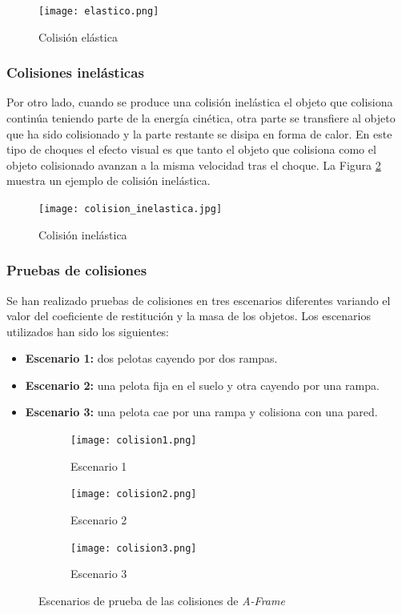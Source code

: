 \begin{figure}[h!]
    \centering
    \texttt{[image: elastico.png]}
    \caption[Colisión elástica]{Colisión elástica\footnotemark}
    \label{fig:elastico}
\end{figure}


\subsubsection{Colisiones inelásticas}
Por otro lado, cuando se produce una colisión inelástica el objeto que colisiona continúa teniendo parte de la energía cinética, otra parte se transfiere al objeto que ha sido colisionado y la parte restante se disipa en forma de calor. En este tipo de choques el efecto visual es que tanto el objeto que colisiona como el objeto colisionado avanzan a la misma velocidad tras el choque. La Figura \ref{fig:inelastico} muestra un ejemplo de colisión inelástica.

\begin{figure}[h!]
    \centering
    \texttt{[image: colision\_inelastica.jpg]}
    \caption[Colisión inelástica]{Colisión inelástica\footnotemark}
    \label{fig:inelastico}
\end{figure}

\subsubsection{Pruebas de colisiones}
Se han realizado pruebas de colisiones en tres escenarios diferentes variando el valor del coeficiente de restitución y la masa de los objetos. Los escenarios utilizados han sido los siguientes:

\begin{itemize}
    \item \textbf{Escenario 1:} dos pelotas cayendo por dos rampas.
    \item \textbf{Escenario 2:} una pelota fija en el suelo y otra cayendo por una rampa.
    \item \textbf{Escenario 3:} una pelota cae por una rampa y colisiona con una pared.
\end{itemize}

\begin{figure}[!h]
  \begin{subfigure}[b]{0.3\textwidth}
    \texttt{[image: colision1.png]}
    \caption{Escenario 1}
  \end{subfigure}
  \hfill
  \begin{subfigure}[b]{0.3\textwidth}
    \texttt{[image: colision2.png]}
    \caption{Escenario 2}
  \end{subfigure}
    \hfill
  \begin{subfigure}[b]{0.3\textwidth}
    \texttt{[image: colision3.png]}
    \caption{Escenario 3}
  \end{subfigure}
  \caption{Escenarios de prueba de las colisiones de \textit{A-Frame}}
 \end{figure}

